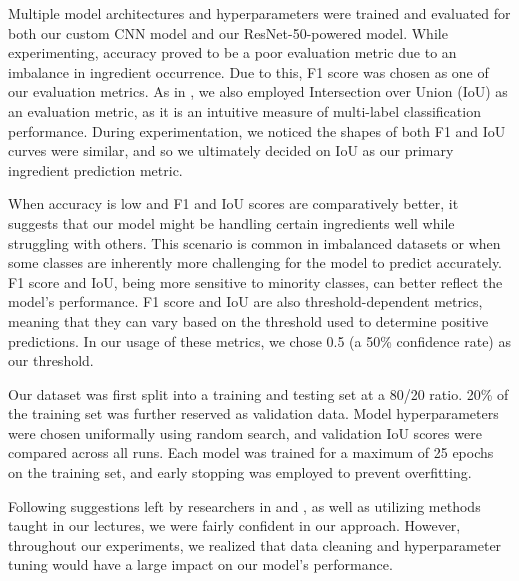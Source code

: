 \documentclass[10pt,twocolumn,letterpaper]{article}
\begin{document}
Multiple model architectures and hyperparameters were trained and evaluated for both our custom CNN model and our ResNet-50-powered model. While experimenting, accuracy proved to be a poor evaluation metric due to an imbalance in ingredient occurrence. Due to this, F1 score was chosen as one of our evaluation metrics. As in \cite{Salvador_Drozdzal_Giro-i-Nieto_Romero_2019_orig_2}, we also employed Intersection over Union (IoU) as an evaluation metric, as it is an intuitive measure of multi-label classification performance. During experimentation, we noticed the shapes of both F1 and IoU curves were similar, and so we ultimately decided on IoU as our primary ingredient prediction metric.

When accuracy is low and F1 and IoU scores are comparatively better, it suggests that our model might be handling certain ingredients well while struggling with others. This scenario is common in imbalanced datasets or when some classes are inherently more challenging for the model to predict accurately. F1 score and IoU, being more sensitive to minority classes, can better reflect the model's performance. F1 score and IoU are also threshold-dependent metrics, meaning that they can vary based on the threshold used to determine positive predictions. In our usage of these metrics, we chose 0.5 (a 50\% confidence rate) as our threshold.

Our dataset was first split into a training and testing set at a 80/20 ratio. 20\% of the training set was further reserved as validation data. Model hyperparameters were chosen uniformally using random search, and validation IoU scores were compared across all runs. Each model was trained for a maximum of 25 epochs on the training set, and early stopping was employed to prevent overfitting.

Following suggestions left by researchers in \cite{recipe1707} and \cite{Salvador_Drozdzal_Giro-i-Nieto_Romero_2019_orig_2}, as well as utilizing methods taught in our lectures, we were fairly confident in our approach. However, throughout our experiments, we realized that data cleaning and hyperparameter tuning would have a large impact on our model's performance.


\end{document}

